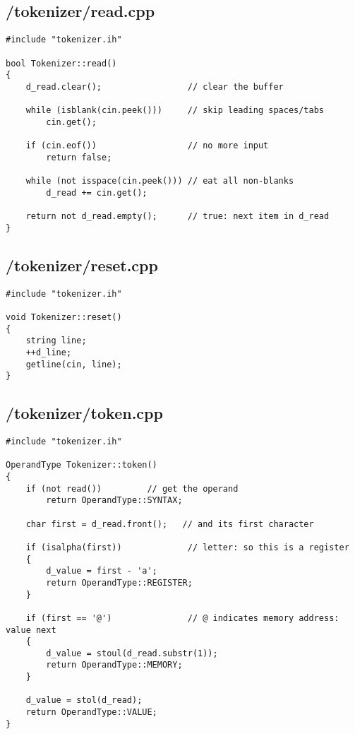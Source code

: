 \documentclass{article}
\begin{document}
\subsection*{/tokenizer/read.cpp}
\begin{verbatim}
#include "tokenizer.ih"

bool Tokenizer::read()
{
    d_read.clear();                 // clear the buffer

    while (isblank(cin.peek()))     // skip leading spaces/tabs
        cin.get();

    if (cin.eof())                  // no more input
        return false;

    while (not isspace(cin.peek())) // eat all non-blanks
        d_read += cin.get();

    return not d_read.empty();      // true: next item in d_read
}

\end{verbatim}
\subsection*{/tokenizer/reset.cpp}
\begin{verbatim}
#include "tokenizer.ih"

void Tokenizer::reset()
{
    string line;
    ++d_line;
    getline(cin, line);
}
\end{verbatim}
\subsection*{/tokenizer/token.cpp}
\begin{verbatim}
#include "tokenizer.ih"

OperandType Tokenizer::token()
{
    if (not read())         // get the operand
        return OperandType::SYNTAX;

    char first = d_read.front();   // and its first character 

    if (isalpha(first))             // letter: so this is a register
    {
        d_value = first - 'a';
        return OperandType::REGISTER;
    }

    if (first == '@')               // @ indicates memory address: value next
    {
        d_value = stoul(d_read.substr(1));
        return OperandType::MEMORY;
    }

    d_value = stol(d_read);
    return OperandType::VALUE;
}
\end{verbatim}
\end{document}
